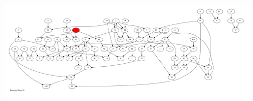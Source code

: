 \documentclass{article}
\begin{document}
\newpage
\includegraphics[max height=\textheight,max width=\textwidth]{looming_object/loom_obj16_pp.pdf}
\end{document}
